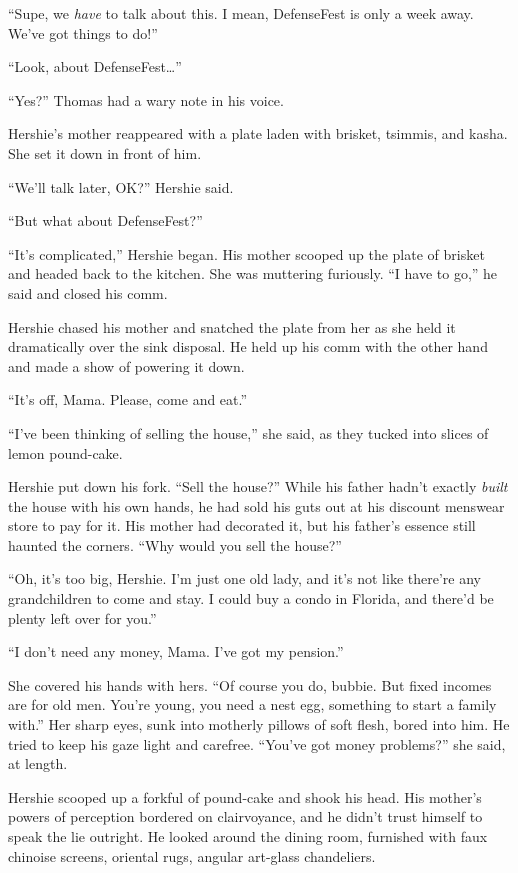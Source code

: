 ``Supe, we \emph{have} to talk about this. I mean, DefenseFest is only a week 
away. We've got things to do!''

``Look, about DefenseFest\ldots{}''

``Yes?'' Thomas had a wary note in his voice.

Hershie's mother reappeared with a plate laden with brisket,
tsimmis, and kasha. She set it down in front of him.

``We'll talk later, OK?'' Hershie said.

``But what about DefenseFest?''

``It's complicated,'' Hershie began. His mother scooped up the
plate of brisket and headed back to the kitchen. She was muttering
furiously. ``I have to go,'' he said and closed his comm.

Hershie chased his mother and snatched the plate from her as she
held it dramatically over the sink disposal. He held up his comm
with the other hand and made a show of powering it down.

``It's off, Mama. Please, come and eat.''

\tb

``I've been thinking of selling the house,'' she said, as they
tucked into slices of lemon pound-cake.

Hershie put down his fork. ``Sell the house?'' While his father
hadn't exactly \emph{built} the house with his own hands, he had
sold his guts out at his discount menswear store to pay for it. His
mother had decorated it, but his father's essence still haunted the
corners. ``Why would you sell the house?''

``Oh, it's too big, Hershie. I'm just one old lady, and it's not like there're 
any grandchildren to come and stay. I could buy a condo in Florida, and there'd 
be plenty left over for you.''

``I don't need any money, Mama. I've got my pension.''

She covered his hands with hers.
``Of course you do, bubbie. But fixed incomes are for old men. You're young, 
you need a nest egg, something to start a family with.''
Her sharp eyes, sunk into motherly pillows of soft flesh, bored
into him. He tried to keep his gaze light and carefree.
``You've got money problems?'' she said, at length.

Hershie scooped up a forkful of pound-cake and shook his head. His
mother's powers of perception bordered on clairvoyance, and he
didn't trust himself to speak the lie outright. He looked around
the dining room, furnished with faux chinoise screens, oriental
rugs, angular art-glass chandeliers.

